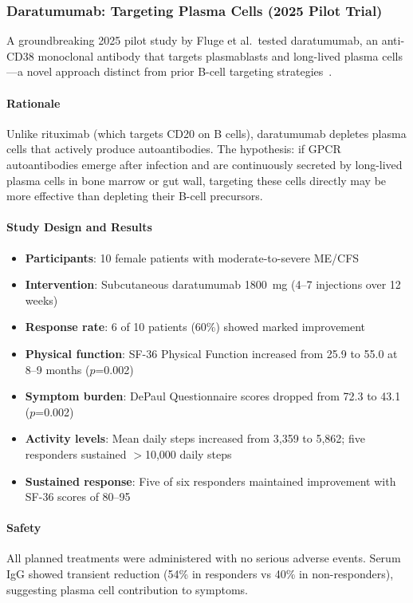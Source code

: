 \subsubsection{Daratumumab: Targeting Plasma Cells (2025 Pilot Trial)}
\label{sec:daratumumab}

A groundbreaking 2025 pilot study by Fluge et al.\ tested daratumumab, an anti-CD38 monoclonal antibody that targets plasmablasts and long-lived plasma cells---a novel approach distinct from prior B-cell targeting strategies~\cite{Fluge2025daratumumab}.

\paragraph{Rationale}
Unlike rituximab (which targets CD20 on B cells), daratumumab depletes plasma cells that actively produce autoantibodies. The hypothesis: if GPCR autoantibodies emerge after infection and are continuously secreted by long-lived plasma cells in bone marrow or gut wall, targeting these cells directly may be more effective than depleting their B-cell precursors.

\paragraph{Study Design and Results}
\begin{itemize}
    \item \textbf{Participants}: 10 female patients with moderate-to-severe ME/CFS
    \item \textbf{Intervention}: Subcutaneous daratumumab 1800~mg (4--7 injections over 12 weeks)
    \item \textbf{Response rate}: 6 of 10 patients (60\%) showed marked improvement
    \item \textbf{Physical function}: SF-36 Physical Function increased from 25.9 to 55.0 at 8--9 months ($p$=0.002)
    \item \textbf{Symptom burden}: DePaul Questionnaire scores dropped from 72.3 to 43.1 ($p$=0.002)
    \item \textbf{Activity levels}: Mean daily steps increased from 3,359 to 5,862; five responders sustained $>$10,000 daily steps
    \item \textbf{Sustained response}: Five of six responders maintained improvement with SF-36 scores of 80--95
\end{itemize}

\paragraph{Safety}
All planned treatments were administered with no serious adverse events. Serum IgG showed transient reduction (54\% in responders vs 40\% in non-responders), suggesting plasma cell contribution to symptoms.

